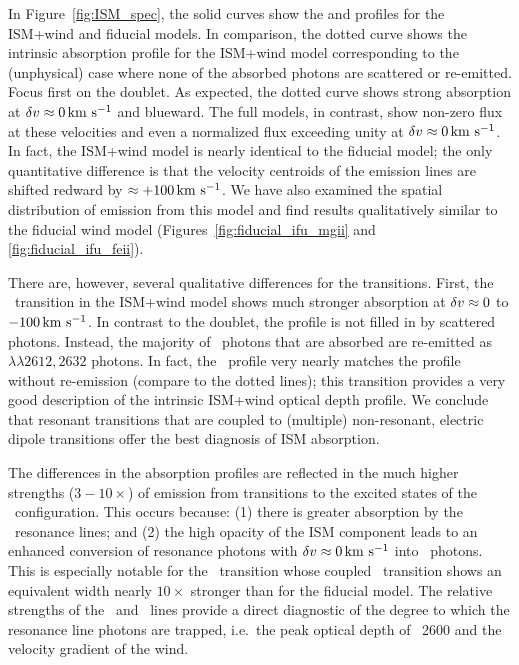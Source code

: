 \documentclass[12pt,preprint]{aastex}
\begin{document}
In Figure~\ref{fig:ISM_spec}, the solid curves show the  and
 profiles for the ISM+wind and fiducial 
models. In comparison, the
dotted curve shows the intrinsic absorption profile for the ISM+wind
model corresponding to the (unphysical) case
where none of the absorbed photons are scattered or re-emitted.   Focus first on the
 doublet.  As expected, the dotted curve shows strong
absorption at $\delta v \approx 0 \, {\rm km~s^{-1}}$ and blueward.  The full models,
in contrast, show non-zero flux at these velocities and even a
normalized flux exceeding unity at $\delta v \approx 0 \, {\rm km~s^{-1}}$.  In
fact, the ISM+wind model is nearly identical to the fiducial model;
the only quantitative difference is that the velocity centroids of
the emission lines are shifted redward by $\approx +100 \, {\rm km~s^{-1}}$.
We have also examined the spatial distribution of emission from 
this model and find results
qualitatively similar to the fiducial wind model
(Figures~\ref{fig:fiducial_ifu_mgii} and \ref{fig:fiducial_ifu_feii}).

There are, however, several qualitative differences 
for the  transitions. 
First, the \feiia\ transition in the ISM+wind model
shows much stronger absorption at $\delta v \approx 0$
to $-100 \, {\rm km~s^{-1}}$.  In contrast to the  doublet,
the profile is not filled in by scattered photons. Instead, 
the majority of \feiia\ photons that are absorbed are re-emitted as
\feiis$\lambda\lambda 2612, 2632$ photons.  In fact, the
\feiia\ profile very nearly matches the profile without re-emission 
(compare to the dotted lines); this transition provides a
very good description of the intrinsic ISM+wind optical depth profile.  
We conclude that resonant transitions that are coupled to (multiple)
non-resonant, electric dipole transitions offer the best
diagnosis of ISM absorption.

The differences in the  absorption profiles are reflected
in the much higher strengths ($3-10\times$) of emission from
transitions to the excited states of the \aconfig\ configuration.   This occurs because:
(1) there is greater absorption by the \feiid\
resonance lines; and (2) the high opacity of the ISM component leads to
an enhanced conversion of resonance photons with $\delta v \approx 0\, {\rm km~s^{-1}}$
into \feiis\ photons.  This is especially notable for the
\feiib\ transition whose coupled \feiis\ transition shows an equivalent width nearly
$10\times$ stronger than for the fiducial model.  The relative
strengths of the \feiib\ and \feiie\ lines provide a direct
diagnostic of the degree to which the resonance line photons are
trapped, i.e.\ the peak optical depth of \ion{Fe}{2}~2600 and
the velocity gradient of the wind.
\end{document}
